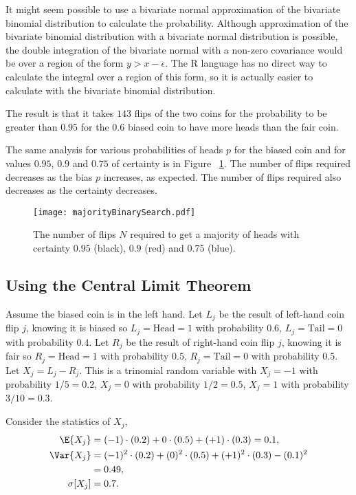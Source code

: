 \documentclass[12pt]{article}
\begin{document}
It might seem possible to use a bivariate normal approximation of the
bivariate binomial distribution to calculate the probability.  Although
approximation of the bivariate binomial distribution with a bivariate
normal distribution is possible, the double integration of the bivariate
normal with a non-zero covariance would be over a region of the form \(
y > x-\epsilon \).  The R language has no direct way to calculate the
integral over a region of this form, so it is actually easier to
calculate with the bivariate binomial distribution.

The result is that it takes \( 143 \) flips of the two coins for the
probability to be greater than \( 0.95 \) for the \( 0.6 \) biased coin
to have more heads than the fair coin.

The same analysis for various probabilities of heads \( p \) for the
biased coin and for values \( 0.95 \), \( 0.9 \) and \( 0.75 \) of
certainty is in Figure~%
\ref{fig:twocoins:majorityBinarySearch}.  The number of flips required
decreases as the bias \( p \) increases, as expected.  The number of
flips required also decreases as the certainty decreases.

\begin{figure}[htbp]
    \centerline{\texttt{[image: majorityBinarySearch.pdf]}}
    \caption{The number of flips $ N $ required to get a majority of
    heads with certainty $ 0.95 $ (black), $ 0.9 $ (red) and $ 0.75
    $ (blue).}%
    \label{fig:twocoins:majorityBinarySearch}
\end{figure}

\subsection*{Using the Central Limit Theorem}

Assume the biased coin is in the left hand.%
Let \( L_j \) be the result of left-hand coin flip \( j \), knowing it
is biased so \( L_j = \text{Head} = 1 \) with probability \( 0.6 \), \(
L_j = \text{Tail} = 0 \) with probability \( 0.4 \).  Let \( R_j \) be
the result of right-hand coin flip \( j \), knowing it is fair so \( R_j
= \text{Head} = 1 \) with probability \( 0.5 \), \( R_j = \text{Tail} =
0 \) with probability \( 0.5 \).  Let \( X_j = L_j - R_j \).  This is a
trinomial random variable with \( X_j = -1 \) with probability \( 1/5 =
0.2 \), \( X_j = 0 \) with probability \( 1/2 = 0.5 \), \( X_j = 1 \)
with probability \( 3/10 = 0.3 \).

Consider the statistics of \( X_j \),
\begin{align*}
    \E{X_j} &= (-1)\cdot(0.2) + 0 \cdot (0.5) + (+1)\cdot(0.3) = 0.1, \\
    \Var{X_j} &= (-1)^2\cdot(0.2)+(0)^2\cdot(0.5)+(+1)^2\cdot(0.3)-(0.1)^2\\
    & =0.49, \\
    \sigma[X_j] &= 0.7.  \\
\end{align*}
\end{document}
